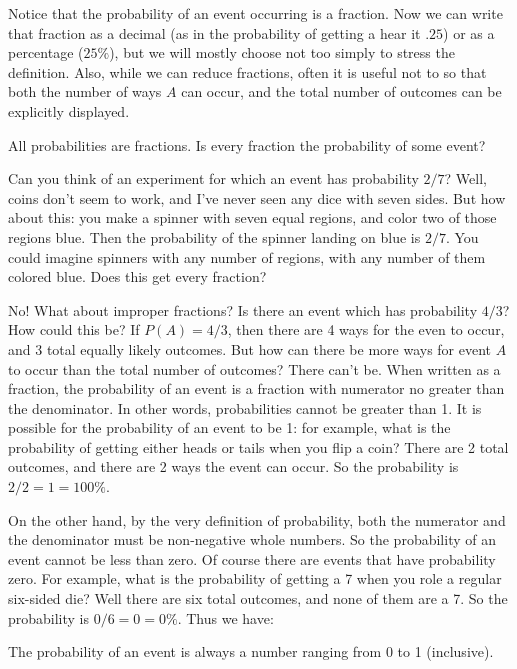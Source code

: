 Notice that the probability of an event occurring is a fraction.  Now we can write that fraction as a decimal (as in the probability of getting a hear it $.25$) or as a percentage ($25\%$), but we will mostly choose not too simply to stress the definition.  Also, while we can reduce fractions, often it is useful not to so that both the number of ways $A$ can occur, and the total number of outcomes can be explicitly displayed.  

\begin{question}
 All probabilities are fractions.  Is every fraction the probability of some event?
\end{question}

Can you think of an experiment for which an event has probability $2/7$?  Well, coins don't seem to work, and I've never seen any dice with seven sides.  But how about this: you make a spinner with seven equal regions, and color two of those regions blue.  Then the probability of the spinner landing on blue is $2/7$.  You could imagine spinners with any number of regions, with any number of them colored blue.  Does this get every fraction?

No! What about improper fractions?  Is there an event which has probability $4/3$?  How could this be?  If $P(A) = 4/3$, then there are 4 ways for the even to occur, and 3 total equally likely outcomes.  But how can there be more ways for event $A$ to occur than the total number of outcomes?  There can't be.  When written as a fraction, the probability of an event is a fraction with numerator no greater than the denominator.  In other words, probabilities cannot be greater than 1.  It is possible for the probability of an event to be 1: for example, what is the probability of getting either heads or tails when you flip a coin?  There are 2 total outcomes, and there are 2 ways the event can occur.  So the probability is $2/2 = 1 = 100\%$.  

On the other hand, by the very definition of probability, both the numerator and the denominator must be non-negative whole numbers.  So the probability of an event cannot be less than zero.  Of course there are events that have probability zero.  For example, what is the probability of getting a 7 when you role a regular six-sided die?  Well there are six total outcomes, and none of them are a 7.  So the probability is $0/6 = 0 = 0\%$.  Thus we have:

\begin{probfact} 
The probability of an event is always a number ranging from 0 to 1 (inclusive). 
\end{probfact}

